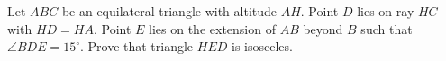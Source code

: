 Let $ABC$ be an equilateral triangle with altitude $AH$. Point $D$ lies on ray $HC$ with $HD=HA$. Point $E$ lies on the extension of $AB$ beyond $B$ such that $\angle BDE=15^\circ$. Prove that triangle $HED$ is isosceles.

